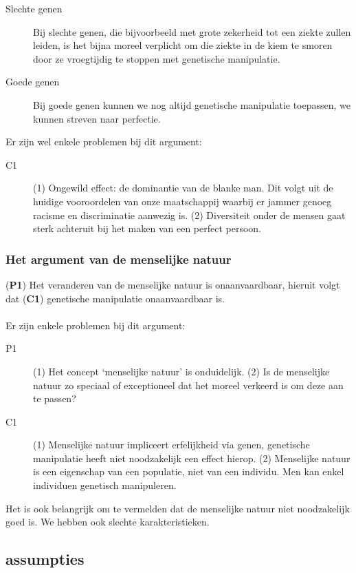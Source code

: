 \documentclass[../summary.tex]{subfiles}
\begin{document}
				\begin{description}
					\item[Slechte genen] Bij slechte genen, die bijvoorbeeld met grote zekerheid tot een ziekte zullen leiden, is het bijna moreel verplicht om die ziekte in de kiem te smoren door ze vroegtijdig te stoppen met genetische manipulatie. 
					\item[Goede genen] Bij goede genen kunnen we nog altijd genetische manipulatie toepassen, we kunnen streven naar perfectie. 
				\end{description}
				Er zijn wel enkele problemen bij dit argument:
				\begin{description}
					\item[C1] (1) Ongewild effect: de dominantie van de blanke man. Dit volgt uit de huidige vooroordelen van onze maatschappij waarbij er jammer genoeg racisme en discriminatie aanwezig is. (2) Diversiteit onder de mensen gaat sterk achteruit bij het maken van een perfect persoon. 
				\end{description}
			
			\subsubsection{Het argument van de menselijke natuur}
				(\textbf{P1}) Het veranderen van de menselijke natuur is onaanvaardbaar, hieruit volgt dat (\textbf{C1}) genetische manipulatie onaanvaardbaar is. \\
				\\
				Er zijn enkele problemen bij dit argument:
				\begin{description}
					\item[P1] (1) Het concept `menselijke natuur' is onduidelijk. (2) Is de menselijke natuur zo speciaal of exceptioneel dat het moreel verkeerd is om deze aan te passen?
					\item[C1] (1) Menselijke natuur impliceert erfelijkheid via genen, genetische manipulatie heeft niet noodzakelijk een effect hierop. (2) Menselijke natuur is een eigenschap van een populatie, niet van een individu. Men kan enkel individuen genetisch manipuleren. 
 				\end{description}
 				Het is ook belangrijk om te vermelden dat de menselijke natuur niet noodzakelijk goed is. We hebben ook slechte karakteristieken.
		\subsection{assumpties}
		
\end{document}

